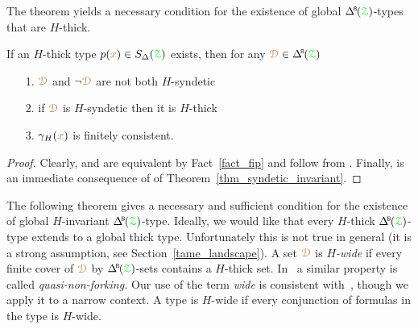


The theorem yields a necessary condition for the existence of global $\BDelta({\grZ})$-types that are $H$-thick.

\begin{corollary}\label{corol_def_mu}
  If an $H$-thick type $p({\color{brown} x})\in S_\Delta({\color{green}\EuScript Z})$ exists, then for any $\mrD\in\BDelta({\grZ})$
  \begin{itemize}
    \item[1.] ${\color{brown}\EuScript D}$ and $\neg{\color{brown}\EuScript D}$ are not both $H$-syndetic
    \item[2.] if ${\color{brown}\EuScript D}$ is $H$-syndetic then it is $H$-thick
    \item[3.] $\gamma_H({\color{brown} x})$ is finitely consistent.\smallskip
  \end{itemize}
\end{corollary}

\begin{proof}
  Clearly,  and  are equivalent by Fact~\ref{fact_fip} and follow from .
  Finally,  is an immediate consequence of  of Theorem~\ref{thm_syndetic_invariant}.
\end{proof}

The following theorem gives a necessary and sufficient condition for the  existence of global $H$-invariant $\BDelta({\grZ})$-type.
Ideally, we would like that every $H$-thick $\BDelta({\grZ})$-type extends to a global thick type.
Unfortunately this is not true in general (it is a strong assumption, see Section~\ref{tame_landscape}).
A set ${\color{brown}\EuScript D}$ is \emph{$H$-wide\/} if every finite cover of ${\color{brown}\EuScript D}$ by $\BDelta({\grZ})$-sets contains a $H$-thick set.
In~\cite{CK} a similar property is called \textit{quasi-non-forking.}
Our use of the term \textit{wide\/} is consistent with~\cite{Hr}, though we apply it to a narrow context.
A type is $H$-wide if every conjunction of formulas in the type is $H$-wide.


